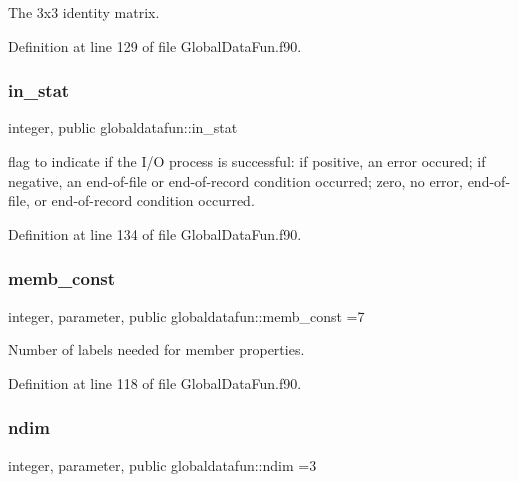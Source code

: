 The 3x3 identity matrix. 



Definition at line 129 of file Global\+Data\+Fun.\+f90.

\mbox{\label{namespaceglobaldatafun_a64c0718f56f06c9fe3cfb49b0dc5ced0}} 
\subsubsection{\texorpdfstring{in\+\_\+stat}{in\_stat}}
{\footnotesize\ttfamily integer, public globaldatafun\+::in\+\_\+stat}



flag to indicate if the I/O process is successful\+: if positive, an error occured; if negative, an end-\/of-\/file or end-\/of-\/record condition occurred; zero, no error, end-\/of-\/file, or end-\/of-\/record condition occurred. 



Definition at line 134 of file Global\+Data\+Fun.\+f90.

\mbox{\label{namespaceglobaldatafun_ae88f4c5de30b425e43d5392116dfdcda}} 
\subsubsection{\texorpdfstring{memb\+\_\+const}{memb\_const}}
{\footnotesize\ttfamily integer, parameter, public globaldatafun\+::memb\+\_\+const =7}



Number of labels needed for member properties. 



Definition at line 118 of file Global\+Data\+Fun.\+f90.

\mbox{\label{namespaceglobaldatafun_a5041a6e08575b124a458c49a76dc6d31}} 
\subsubsection{\texorpdfstring{ndim}{ndim}}
{\footnotesize\ttfamily integer, parameter, public globaldatafun\+::ndim =3}



